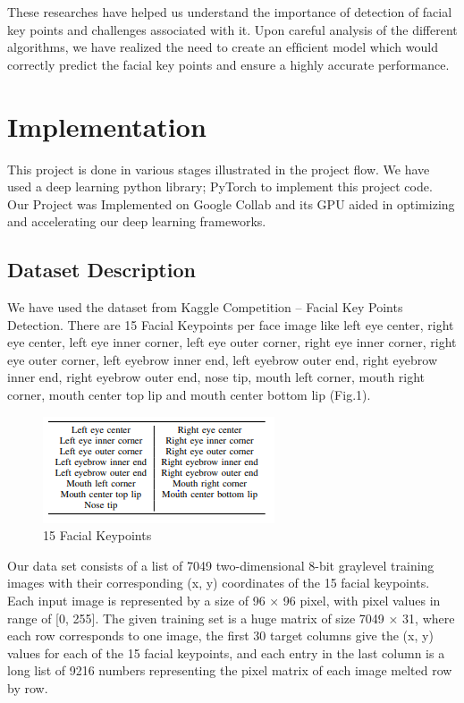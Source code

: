 \documentclass[conference]{IEEEtran}
\begin{document}
These researches have helped us understand the importance of detection of facial key points and challenges associated with it. Upon careful analysis of the different algorithms, we have realized the need to create an efﬁcient model which would correctly predict the facial key points and ensure a highly accurate performance. 



 
\section{Implementation}

This project is done in various stages illustrated in the project ﬂow. We have used a deep learning python library; PyTorch to implement this project code. Our Project was Implemented on Google Collab and its GPU aided in optimizing and accelerating our deep learning frameworks. 

\subsection{Dataset Description}
We have used the dataset from Kaggle Competition – Facial Key Points Detection. There are 15 Facial Keypoints per face image like left eye center, right eye center, left eye inner corner, left eye outer corner, right eye inner corner, right eye outer corner, left eyebrow inner end, left eyebrow outer end, right eyebrow inner end, right eyebrow outer end, nose tip, mouth left corner, mouth right corner, mouth center top lip and mouth center bottom lip (Fig.1). 

\begin{figure}[h!]
    \centering
    \includegraphics[scale=1.0]{keypoints.png}
    \caption{15 Facial Keypoints}
    \label{fig:my_label}
\end{figure}

Our data set consists of a list of 7049 two-dimensional 8-bit graylevel training images with their corresponding (x, y) coordinates of the 15 facial keypoints. Each input image is represented by a size of 96 × 96 pixel, with pixel values in range of [0, 255]. The given training set is a huge matrix of size 7049 × 31, where each row corresponds to one image, the first 30 target columns give the (x, y) values for each of the 15 facial keypoints, and each entry in the last column is a long list of 9216 numbers representing the pixel matrix of each image melted row by row.
\end{document}
